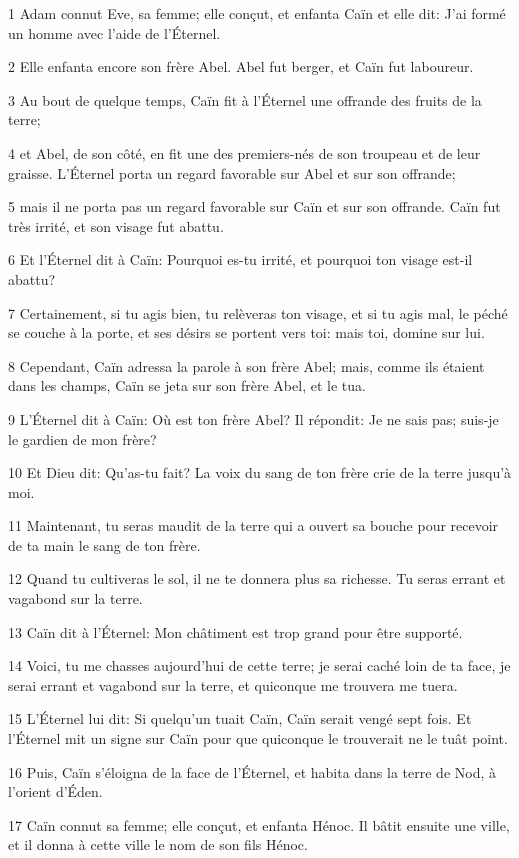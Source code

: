 \par 1 Adam connut Eve, sa femme; elle conçut, et enfanta Caïn et elle dit: J'ai formé un homme avec l'aide de l'Éternel.
\par 2 Elle enfanta encore son frère Abel. Abel fut berger, et Caïn fut laboureur.
\par 3 Au bout de quelque temps, Caïn fit à l'Éternel une offrande des fruits de la terre;
\par 4 et Abel, de son côté, en fit une des premiers-nés de son troupeau et de leur graisse. L'Éternel porta un regard favorable sur Abel et sur son offrande;
\par 5 mais il ne porta pas un regard favorable sur Caïn et sur son offrande. Caïn fut très irrité, et son visage fut abattu.
\par 6 Et l'Éternel dit à Caïn: Pourquoi es-tu irrité, et pourquoi ton visage est-il abattu?
\par 7 Certainement, si tu agis bien, tu relèveras ton visage, et si tu agis mal, le péché se couche à la porte, et ses désirs se portent vers toi: mais toi, domine sur lui.
\par 8 Cependant, Caïn adressa la parole à son frère Abel; mais, comme ils étaient dans les champs, Caïn se jeta sur son frère Abel, et le tua.
\par 9 L'Éternel dit à Caïn: Où est ton frère Abel? Il répondit: Je ne sais pas; suis-je le gardien de mon frère?
\par 10 Et Dieu dit: Qu'as-tu fait? La voix du sang de ton frère crie de la terre jusqu'à moi.
\par 11 Maintenant, tu seras maudit de la terre qui a ouvert sa bouche pour recevoir de ta main le sang de ton frère.
\par 12 Quand tu cultiveras le sol, il ne te donnera plus sa richesse. Tu seras errant et vagabond sur la terre.
\par 13 Caïn dit à l'Éternel: Mon châtiment est trop grand pour être supporté.
\par 14 Voici, tu me chasses aujourd'hui de cette terre; je serai caché loin de ta face, je serai errant et vagabond sur la terre, et quiconque me trouvera me tuera.
\par 15 L'Éternel lui dit: Si quelqu'un tuait Caïn, Caïn serait vengé sept fois. Et l'Éternel mit un signe sur Caïn pour que quiconque le trouverait ne le tuât point.
\par 16 Puis, Caïn s'éloigna de la face de l'Éternel, et habita dans la terre de Nod, à l'orient d'Éden.
\par 17 Caïn connut sa femme; elle conçut, et enfanta Hénoc. Il bâtit ensuite une ville, et il donna à cette ville le nom de son fils Hénoc.
